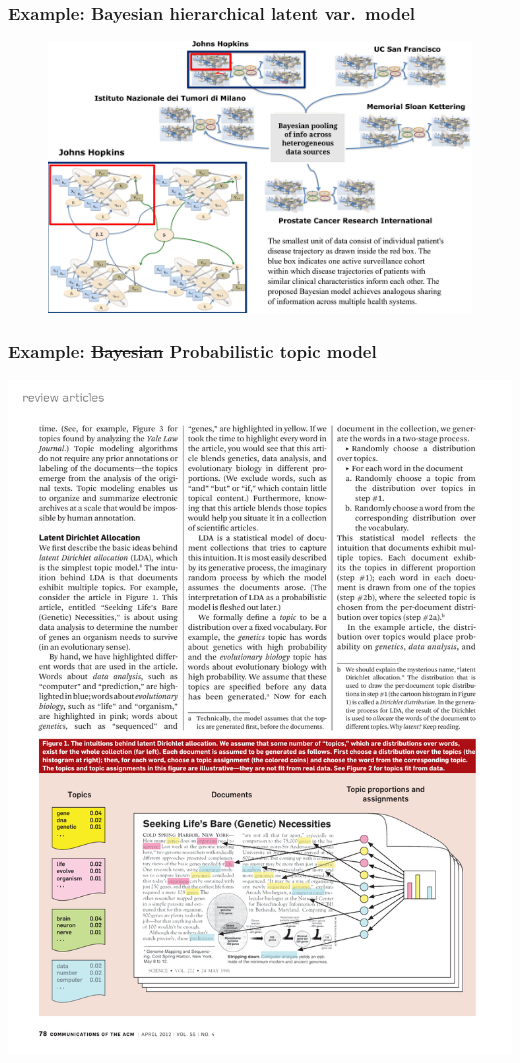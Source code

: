\documentclass[18pt]{beamer}
\begin{document}
\begin{frame}
\frametitle{Example: Bayesian \textcolor{jhuSpiritBlue}{hierarchical} latent var.\ model}

\begin{figure}
\centering
\includegraphics[width=\linewidth]{Figure/bayesian_hierarchical_modeling_of_multiple_cohorts}
\end{figure}

\end{frame}


\begin{frame}
\frametitle{Example:  \st{Bayesian} Probabilistic topic model}
\vspace*{.15\baselineskip}

\hspace*{-.03\linewidth}
\includegraphics[width=1.04\linewidth]{Figure/lda_viz}
\end{frame}
\end{document}
